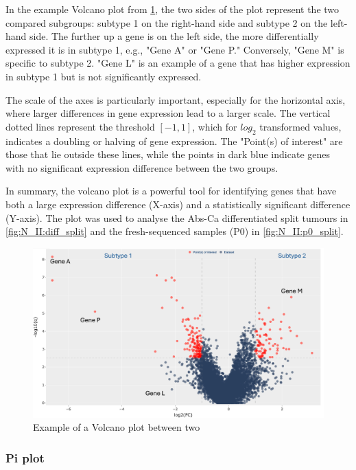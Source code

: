 In the example Volcano plot from \cref{fig:lit:dea_eg}, the two sides of the plot represent the two compared subgroups: subtype 1 on the right-hand side and subtype 2 on the left-hand side. The further up a gene is on the left side, the more differentially expressed it is in subtype 1, e.g., "Gene A" or "Gene P." Conversely, "Gene M" is specific to subtype 2. "Gene L" is an example of a gene that has higher expression in subtype 1 but is not significantly expressed.

The scale of the axes is particularly important, especially for the horizontal axis, where larger differences in gene expression lead to a larger scale. The vertical dotted lines represent the threshold $[-1, 1]$, which for $log_{2}$ transformed values, indicates a doubling or halving of gene expression. The "Point(s) of interest" are those that lie outside these lines, while the points in dark blue indicate genes with no significant expression difference between the two groups.

In summary, the volcano plot is a powerful tool for identifying genes that have both a large expression difference (X-axis) and a statistically significant difference (Y-axis). The plot was used to analyse the Abs-Ca differentiated split tumours in \cref{fig:N_II:diff_split} and the fresh-sequenced samples (P0) in \cref{fig:N_II:p0_split}.

\begin{figure}[H] 
    \centering
    \includegraphics[width=1.0\textwidth,height=1.0\textheight,keepaspectratio]{Sections/Lit_review/Resources/volcano_explainer.png}
    \caption[Volcano example]{Example of a Volcano plot between two}
    \label{fig:lit:dea_eg}
\end{figure}


\subsubsection{Pi plot} \label{s:lit:pi}


